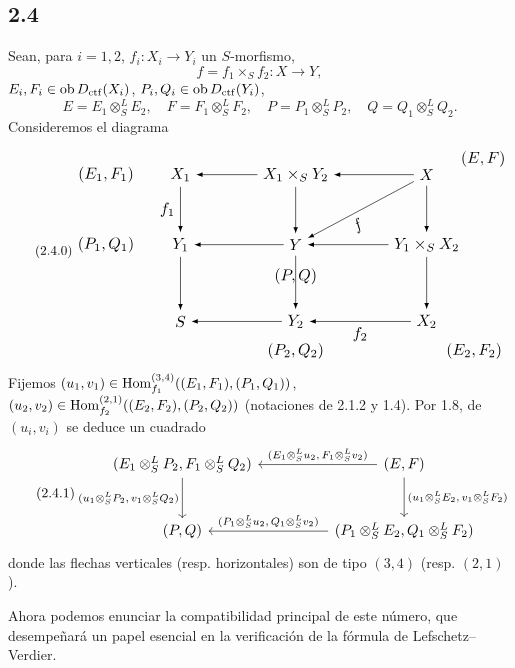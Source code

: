 \subsection*{2.4}
Sean, para $i=1,2$, $f_i:X_i\to Y_i$ un $S$-morfismo,
\[
f=f_1\times_S f_2:X\to Y,
\]
$E_i,F_i\in\operatorname{ob} D_{\mathrm{ctf}}(X_i)$, $P_i,Q_i\in\operatorname{ob} D_{\mathrm{ctf}}(Y_i)$,
\[
E=E_1\otimes^{L}_{S}E_2,
\quad F=F_1\otimes^{L}_{S}F_2,
\quad P=P_1\otimes^{L}_{S}P_2,
\quad Q=Q_1\otimes^{L}_{S}Q_2.
\]
Consideremos el diagrama
\begin{equation}\tag{2.4.0}
\resizebox{0.96\textwidth}{!}{%
\begin{tikzpicture}[>=latex,baseline=(current bounding box.center)]
\node (EF1) at (-5.2,2.0) {$(E_1,F_1)$};
\node (X1)  at (-3.55,2.0) {$X_1$};
\node (X1Y2) at (-1.0,2.0) {$X_1\times_S Y_2$};
\node (X) at (1.9,2.0) {$X$};
\node (EF) at (3.15,2.35) {$(E,F)$};
\node (PQ1) at (-5.2,0.45) {$(P_1,Q_1)$};
\node (Y1) at (-3.55,0.45) {$Y_1$};
\node (Y) at (-1.0,0.45) {$Y$};
\node (Y1X2) at (1.9,0.45) {$Y_1\times_S X_2$};
\node (S) at (-3.55,-1.25) {$S$};
\node (Y2) at (-1.0,-1.25) {$Y_2$};
\node (X2) at (1.9,-1.25) {$X_2$};
\node (PQ) at (-1.0,-0.25) {$(P,Q)$};
\node (PQ2) at (-1.0,-1.9) {$(P_2,Q_2)$};
\node (EF2) at (2.95,-1.9) {$(E_2,F_2)$};
\draw[->] (X1Y2) -- (X1);
\draw[->] (X) -- (X1Y2);
\draw[->] (X1) -- node[left] {$f_1$} (Y1);
\draw[->] (X1Y2) -- (Y);
\draw[->] (X) -- (Y1X2);
\draw[->] (X) -- node[below,sloped,pos=.58] {$f$} (Y);
\draw[->] (Y) -- (Y1);
\draw[->] (Y1X2) -- (Y);
\draw[->] (Y1) -- (S);
\draw[->] (Y) -- (Y2);
\draw[->] (Y1X2) -- (X2);
\draw[->] (Y2) -- (S);
\draw[->] (X2) -- node[below] {$f_2$} (Y2);
\end{tikzpicture}}
\end{equation}
Fijemos $(u_1,v_1)\in\operatorname{Hom}_{f_1}^{(3,4)}((E_1,F_1),(P_1,Q_1))$, $(u_2,v_2)\in\operatorname{Hom}_{f_2}^{(2,1)}((E_2,F_2),(P_2,Q_2))$ (notaciones de 2.1.2 y 1.4). Por 1.8, de $(u_i,v_i)$ se deduce un cuadrado
\begin{equation}\tag{2.4.1}
\resizebox{0.92\textwidth}{!}{%
\begin{tikzcd}[ampersand replacement=\&,column sep=huge,row sep=large]
(E_1\otimes^L_S P_2,F_1\otimes^L_S Q_2)
  \arrow[d,"{(u_1\otimes^L_S P_2,\,v_1\otimes^L_S Q_2)}"']
  \& (E,F) \arrow[l,"{(E_1\otimes^L_S u_2,\,F_1\otimes^L_S v_2)}"'] \arrow[d,"{(u_1\otimes^L_S E_2,\,v_1\otimes^L_S F_2)}"] \\
(P,Q)
  \& (P_1\otimes^L_S E_2,Q_1\otimes^L_S F_2) \arrow[l,"{(P_1\otimes^L_S u_2,\,Q_1\otimes^L_S v_2)}"']
\end{tikzcd}}
\end{equation}
donde las flechas verticales (resp. horizontales) son de tipo $(3,4)$ (resp. $(2,1)$).

Ahora podemos enunciar la compatibilidad principal de este número, que desempeñará un papel esencial en la verificación de la fórmula de Lefschetz--Verdier.

